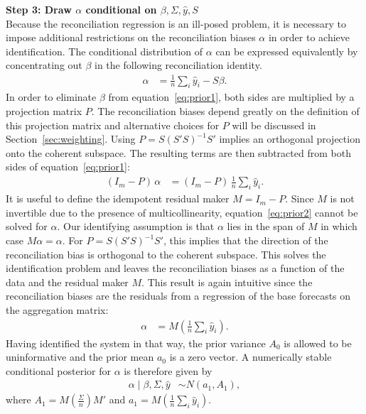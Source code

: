\documentclass[a4paper,fleqn,11pt]{article}
\begin{document}
\noindent\textbf{Step 3: Draw $\alpha$ conditional on $\beta,\Sigma,\hat{y},S$}\\
Because the reconciliation regression is an ill-posed problem, it is necessary to impose additional restrictions on the reconciliation biases $\alpha$ in order to achieve identification. The conditional distribution of $\alpha$ can be expressed equivalently by concentrating out $\beta$ in the following reconciliation identity.
\begin{align}
	\label{eq:prior1}
	\alpha &= \frac{1}{n}\sum_i \hat{y}_i - S\beta.
\end{align}
In order to eliminate $\beta$ from equation~\eqref{eq:prior1}, both sides are multiplied by a projection matrix $P$. The reconciliation biases depend greatly on the definition of this projection matrix and alternative choices for $P$ will be discussed in Section~\ref{sec:weighting}. Using $P = S(S'S)^{-1}S'$ implies an orthogonal projection onto the coherent subspace. The resulting terms are then subtracted from both sides of equation~\eqref{eq:prior1}:
\begin{align}
	\label{eq:prior2}
	(I_m - P)\, \alpha &= (I_m - P)\, \frac{1}{n}\sum_i \hat{y}_i.
\end{align}
It is useful to define the idempotent residual maker $M = I_m - P$. Since $M$ is not invertible due to the presence of multicollinearity, equation~\eqref{eq:prior2} cannot be solved for $\alpha$. Our identifying assumption is that $\alpha$ lies in the span of $M$ in which case $M\alpha = \alpha$. For $P=S(S'S)^{-1}S'$, this implies that the direction of the reconciliation bias is orthogonal to the coherent subspace. This solves the identification problem and leaves the reconciliation biases as a function of the data and the residual maker $M$. This result is again intuitive since the reconciliation biases are the residuals from a regression of the base forecasts on the aggregation matrix:
\begin{align}
\alpha &= M\left(\frac{1}{n}\sum_i \hat{y}_i\right).
\end{align}
 Having identified the system in that way, the prior variance $A_0$ is allowed to be uninformative and the prior mean $a_0$ is a zero vector. A numerically stable conditional posterior for $\alpha$ is therefore given by
\begin{align}
	\label{eq:alpha}
	\alpha \mid \beta,\Sigma,\hat{y} &\sim N(a_1,A_1),
\end{align}
where $A_1 = M\left(\frac{\Sigma}{n}\right)M'$ and $a_1 = M\left(\frac{1}{n}\sum_i \hat{y}_i\right)$.
\end{document}
